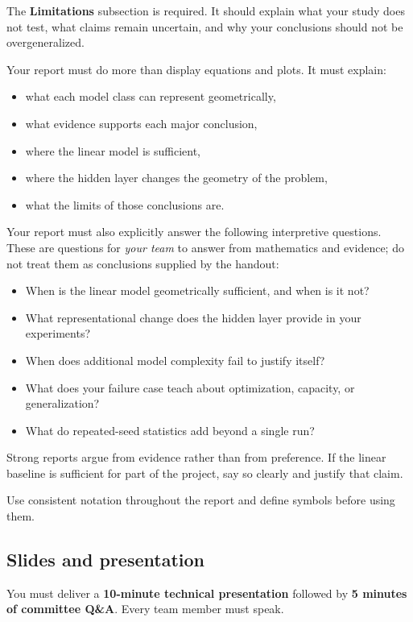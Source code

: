 \documentclass[11pt]{article}
\begin{document}
The \textbf{Limitations} subsection is required. It should explain what your study does not test, what claims remain uncertain, and why your conclusions should not be overgeneralized.

Your report must do more than display equations and plots. It must explain:

\begin{itemize}
    \item what each model class can represent geometrically,
    \item what evidence supports each major conclusion,
    \item where the linear model is sufficient,
    \item where the hidden layer changes the geometry of the problem,
    \item what the limits of those conclusions are.
\end{itemize}

Your report must also explicitly answer the following interpretive questions. These are questions for \emph{your team} to answer from mathematics and evidence; do not treat them as conclusions supplied by the handout:

\begin{itemize}
    \item When is the linear model geometrically sufficient, and when is it not?
    \item What representational change does the hidden layer provide in your experiments?
    \item When does additional model complexity fail to justify itself?
    \item What does your failure case teach about optimization, capacity, or generalization?
    \item What do repeated-seed statistics add beyond a single run?
\end{itemize}

Strong reports argue from evidence rather than from preference. If the linear baseline is sufficient for part of the project, say so clearly and justify that claim.

Use consistent notation throughout the report and define symbols before using them.

\subsection{Slides and presentation}

You must deliver a \textbf{10-minute technical presentation} followed by \textbf{5 minutes of committee Q\&A}. Every team member must speak.
\end{document}
